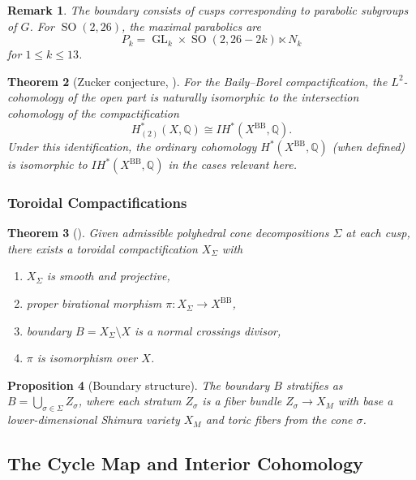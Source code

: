 \documentclass[12pt]{amsart}
\newtheorem{theorem}{Theorem}[section]
\newtheorem{proposition}[theorem]{Proposition}
\newtheorem{remark}[theorem]{Remark}
\theoremstyle{definition}
\DeclareMathOperator\SO{SO}
\DeclareMathOperator\GL{GL}
\newcommand{\Q}{\mathbb{Q}}
\newcommand{\IH}{\mathit{IH}}
\begin{document}
\begin{remark}
The boundary consists of cusps corresponding to parabolic subgroups of $G$. For $\SO(2, 26)$, the maximal parabolics are
\[
P_k = \GL_k \times \SO(2, 26 - 2k) \ltimes N_k
\]
for $1 \le k \le 13$.
\end{remark}

\begin{theorem}[Zucker conjecture, \cite{Looijenga-Saper-Stern}]
For the Baily--Borel compactification, the $L^2$-cohomology of the open part is naturally isomorphic to the intersection cohomology of the compactification
\[
H^*_{(2)}(X, \Q) \cong \IH^*(X^{\mathrm{BB}}, \Q).
\]
Under this identification, the ordinary cohomology $H^*(X^{\mathrm{BB}}, \Q)$ (when defined) is isomorphic to $\IH^*(X^{\mathrm{BB}}, \Q)$ in the cases relevant here.
\end{theorem}

\subsubsection{Toroidal Compactifications}

\begin{theorem}[\cite{Ash-Mumford-Rapoport-Tai}]
Given admissible polyhedral cone decompositions $\Sigma$ at each cusp, there exists a toroidal compactification $X_{\Sigma}$ with
\begin{enumerate}
\item $X_{\Sigma}$ is smooth and projective,
\item proper birational morphism $\pi \colon X_{\Sigma} \to X^{\mathrm{BB}}$,
\item boundary $B = X_{\Sigma} \setminus X$ is a normal crossings divisor,
\item $\pi$ is isomorphism over $X$.
\end{enumerate}
\end{theorem}

\begin{proposition}[Boundary structure]
The boundary $B$ stratifies as $B = \bigcup_{\sigma \in \Sigma} Z_{\sigma}$, where each stratum $Z_{\sigma}$ is a fiber bundle $Z_{\sigma} \to X_M$ with base a lower-dimensional Shimura variety $X_M$ and toric fibers from the cone $\sigma$.
\end{proposition}

\subsection{The Cycle Map and Interior Cohomology}
\end{document}

